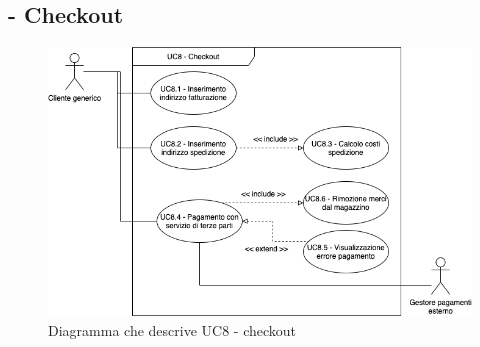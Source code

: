 \stepUserCase
\subsection{ - Checkout}
\begin{figure}[H]
    \centering
    \includegraphics[width=\linewidth]{res/images/UC/UC8.png}
    \caption{Diagramma che descrive UC8 - checkout} 
\end{figure}
